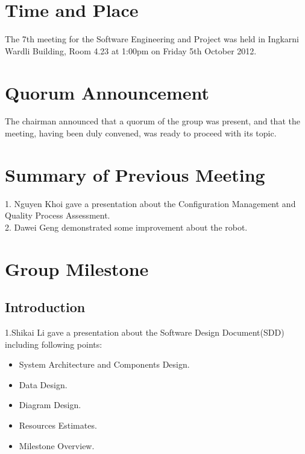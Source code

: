\documentclass[11pt, a4paper]{article}
\begin{document}
\section{Time and Place}
The 7th meeting for the Software Engineering and Project was held in Ingkarni Wardli Building, Room     4.23 at 1:00pm on Friday 5th October 2012.

\section{Quorum Announcement}
The chairman announced that a quorum of the group was present, and that the meeting, having been duly convened, was ready to proceed with its topic.

\section{Summary of Previous Meeting}
1. Nguyen Khoi gave a presentation about the Configuration Management and Quality Process Assessment.\\
2. Dawei Geng demonstrated some improvement about the robot.\\


\section{Group Milestone}

\subsection{Introduction}
1.Shikai Li gave a presentation about the Software Design Document(SDD) including following points:
\begin{itemize}
\item System Architecture and Components Design.
\item Data Design.
\item Diagram Design.
\item Resources Estimates.
\item Milestone Overview.
\end{itemize}
\end{document}
